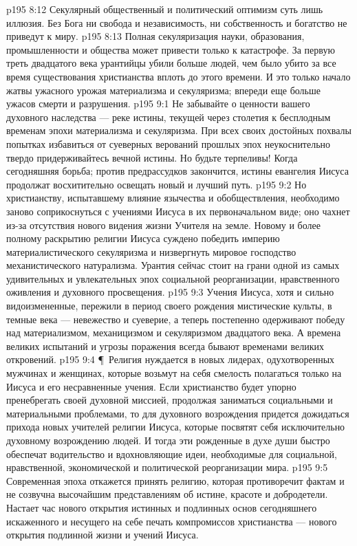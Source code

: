 \vs p195 8:12 Секулярный общественный и политический оптимизм суть лишь иллюзия. Без Бога ни свобода и независимость, ни собственность и богатство не приведут к миру.
\vs p195 8:13 Полная секуляризация науки, образования, промышленности и общества может привести только к катастрофе. За первую треть двадцатого века урантийцы убили больше людей, чем было убито за все время существования христианства вплоть до этого времени. И это только начало жатвы ужасного урожая материализма и секуляризма; впереди еще больше ужасов смерти и разрушения.
\vs p195 9:1 Не забывайте о ценности вашего духовного наследства --- реке истины, текущей через столетия к бесплодным временам эпохи материализма и секуляризма. При всех своих достойных похвалы попытках избавиться от суеверных верований прошлых эпох неукоснительно твердо придерживайтесь вечной истины. Но будьте терпеливы! Когда сегодняшняя борьба; против предрассудков закончится, истины евангелия Иисуса продолжат восхитительно освещать новый и лучший путь.
\vs p195 9:2 Но христианству, испытавшему влияние язычества и обобществления, необходимо заново соприкоснуться с учениями Иисуса в их первоначальном виде; оно чахнет из\hyp{}за отсутствия нового видения жизни Учителя на земле. Новому и более полному раскрытию религии Иисуса суждено победить империю материалистического секуляризма и низвергнуть мировое господство механистического натурализма. Урантия сейчас стоит на грани одной из самых удивительных и увлекательных эпох социальной реорганизации, нравственного оживления и духовного просвещения.
\vs p195 9:3 Учения Иисуса, хотя и сильно видоизмененные, пережили в период своего рождения мистические культы, в темные века --- невежество и суеверие, а теперь постепенно одерживают победу над материализмом, механицизмом и секуляризмом двадцатого века. А времена великих испытаний и угрозы поражения всегда бывают временами великих откровений.
\vs p195 9:4 \P\ Религия нуждается в новых лидерах, одухотворенных мужчинах и женщинах, которые возьмут на себя смелость полагаться только на Иисуса и его несравненные учения. Если христианство будет упорно пренебрегать своей духовной миссией, продолжая заниматься социальными и материальными проблемами, то для духовного возрождения придется дожидаться прихода новых учителей религии Иисуса, которые посвятят себя исключительно духовному возрождению людей. И тогда эти рожденные в духе души быстро обеспечат водительство и вдохновляющие идеи, необходимые для социальной, нравственной, экономической и политической реорганизации мира.
\vs p195 9:5 Современная эпоха откажется принять религию, которая противоречит фактам и не созвучна высочайшим представлениям об истине, красоте и добродетели. Настает час нового открытия истинных и подлинных основ сегодняшнего искаженного и несущего на себе печать компромиссов христианства --- нового открытия подлинной жизни и учений Иисуса.
